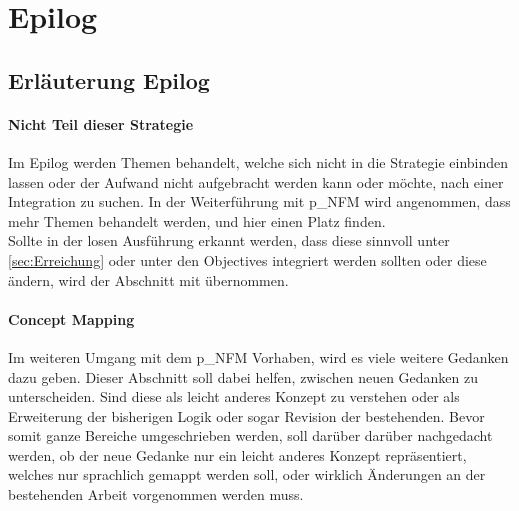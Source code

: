 \section{Epilog}\label{sec:NFMEpilog}

\subsection{Erläuterung Epilog}
\paragraph{Nicht Teil dieser Strategie}
Im Epilog werden Themen behandelt, welche sich nicht in die Strategie einbinden lassen oder der Aufwand nicht aufgebracht werden kann oder möchte, nach einer Integration zu suchen. In der Weiterführung mit \gls{p_NFM} wird angenommen, dass mehr Themen behandelt werden, und hier einen Platz finden.\\


Sollte in der losen Ausführung erkannt werden, dass diese sinnvoll unter \ref{sec:Erreichung} oder unter den Objectives integriert werden sollten oder diese ändern, wird der Abschnitt mit übernommen.

\paragraph{Concept Mapping}
Im weiteren Umgang mit dem \gls{p_NFM} Vorhaben, wird es viele weitere Gedanken dazu geben. Dieser Abschnitt soll dabei helfen, zwischen neuen Gedanken zu unterscheiden. Sind diese als leicht anderes Konzept zu verstehen oder als Erweiterung der bisherigen Logik oder sogar Revision der bestehenden. Bevor somit ganze Bereiche umgeschrieben werden, soll darüber darüber nachgedacht werden, ob der neue Gedanke nur ein leicht anderes Konzept repräsentiert, welches nur sprachlich gemappt werden soll, oder wirklich Änderungen an der bestehenden Arbeit vorgenommen werden muss.


